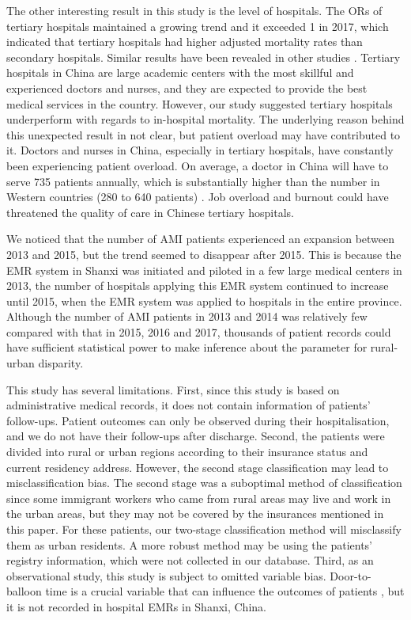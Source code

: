 \documentclass[ijerph,article,submit,moreauthors,pdftex,10pt,a4paper]{mdpi}
\theoremstyle{mdpi}
\newcounter{ex}
\newcounter{re}
\theoremstyle{mdpidefinition}
\begin{document}
The other interesting result in this study is the level of hospitals. The ORs of tertiary hospitals maintained a growing trend and it exceeded 1 in 2017, which indicated that tertiary hospitals had higher adjusted mortality rates than secondary hospitals. Similar results have been revealed in other studies \cite{cai2018does, xu2015variations}. Tertiary hospitals in China are large academic centers with the most skillful and experienced doctors and nurses, and they are expected to provide the best medical services in the country. However, our study suggested tertiary hospitals underperform with regards to in-hospital mortality. The underlying reason behind this unexpected result in not clear, but patient overload may have contributed to it. Doctors and nurses in China, especially in tertiary hospitals, have constantly been experiencing patient overload. On average, a doctor in China will have to serve 735 patients annually, which is substantially higher than the number in Western countries (280 to 640 patients) \cite{wu2013factors}. Job overload and burnout could have threatened the quality of care in Chinese tertiary hospitals.

We noticed that the number of AMI patients experienced an expansion between 2013 and 2015, but the trend seemed to disappear after 2015. This is because the EMR system in Shanxi was initiated and piloted in a few large medical centers in 2013, the number of hospitals applying this EMR system continued to increase until 2015, when the EMR system was applied to hospitals in the entire province. Although the number of AMI patients in 2013 and 2014 was relatively few compared with that in 2015, 2016 and 2017, thousands of patient records could have sufficient statistical power to make inference about the parameter for rural-urban disparity.


This study has several limitations. First, since this study is based on administrative medical records, it does not contain information of  patients' follow-ups. Patient outcomes can only be observed during their hospitalisation, and we do not have their follow-ups after discharge. Second, the patients were divided into rural or urban regions according to their insurance status and current residency address. However, the second stage classification may lead to misclassification bias. The second stage was a suboptimal method of classification since some immigrant workers who came from rural areas may live and work in the urban areas, but they may not be covered by the insurances mentioned in this paper. For these patients, our two-stage classification method will misclassify them as urban residents. A more robust method may be using the patients' registry information, which were not collected in our database. Third, as an observational study, this study is subject to omitted variable bias. Door-to-balloon time is a crucial variable that can influence the outcomes of patients \cite{menees2013door}, but it is not recorded in hospital EMRs in Shanxi, China. 
\end{document}
